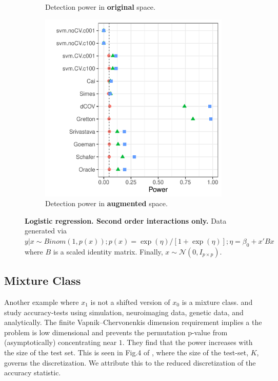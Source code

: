\documentclass[]{bio}
\begin{document}
\begin{figure}[th]
\begin{subfigure}[t]{.3\columnwidth}
	\caption{Detection power in \textbf{original} space.} 
	\label{fig:logistic-interactions-only-original}
	\end{subfigure}
	\begin{subfigure}[t]{.3\columnwidth}
	\centering
	\includegraphics[width=1\columnwidth]{"art/file43"}
	\caption{Detection power in \textbf{augmented} space.} 
	\label{fig:logistic-interactions-only-augmented}
	\end{subfigure}
	\caption{\textbf{Logistic regression. Second order interactions only.}
		Data generated via $y|x \sim Binom(1,p(x));
		p(x)=\exp(\eta)/[1+\exp(\eta)];
		\eta=\beta_0+x'Bx$ 
		where $B$ is a scaled identity matrix.
		Finally, $x\sim \mathcal{N}(0,I_{p\times p})$.	
	}
	\label{fig:logistic-interactions-only}
\end{figure}







\subsection{Mixture Class}

Another example where $x_1$ is not a shifted version of $x_0$ is a mixture class. 
\cite{golland_permutation_2003} and \cite{golland_permutation_2005} study accuracy-tests using simulation, neuroimaging data, genetic data, and analytically.
The finite Vapnik–Chervonenkis dimension requirement \cite[Sec 4.3]{golland_permutation_2005} implies a the problem is low dimensional and prevents the permutation p-value from (asymptotically) concentrating near $1$. 
They find that the power increases with the size of the test set.
This is seen in Fig.4 of \cite{golland_permutation_2005}, where the size of the test-set, $K$, governs the discretization. 
We attribute this to the reduced discretization of the accuracy statistic.
\end{document}
